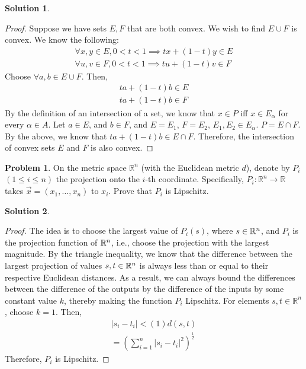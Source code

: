 \documentclass[12pt]{article}
\theoremstyle{definition} %
\newtheorem{solution}{Solution}
\newtheorem{problem}{Problem}
\theoremstyle{plain} %
\begin{document}
\begin{solution}
    \begin{proof}
        Suppose we have sets $E,F$ that are both convex. We wish to find $E\cup F$ is convex. We know the following:
        \begin{align}
            \forall x, y \in E, 0<t<1 \implies tx+(1-t)y\in E\\[10pt] 
            \forall u, v \in F, 0<t<1 \implies tu+(1-t)v \in F
        \end{align}
        Choose $\forall a,b \in E\cup F$. Then,
        \begin{align}
            ta+(1-t)b\in E\\[10pt] 
            ta+(1-t)b \in F
        \end{align} 
        By the definition of an intersection of a set, we know that $x\in P$ iff $x\in E_{\alpha}$ for every $\alpha \in A$. Let $a \in E$, and $b \in F$, and $E = E_1$, $F = E_2$, $E_1, E_2 \in E_{\alpha}$. $P=E\cap F$. By the above, we know that $ta+(1-t)b\in E\cap F$. Therefore, the intersection of convex sets $E$ and $F$ is also convex.        
    \end{proof}
\end{solution}
\begin{problem}
On the metric space $\mathbb{R}^n$ (with the Euclidean metric $d$), denote by $P_i$ $(1 \leq i \leq n)$ the projection onto the $i$-th coordinate. Specifically, $P_i : \mathbb{R}^n \to \mathbb{R}$ takes $\vec{x} = (x_1, \dots, x_n)$ to $x_i$. Prove that $P_i$ is Lipschitz.
\end{problem}
\begin{solution}
    \begin{proof}
        The idea is to choose the largest value of $P_i(s)$, where $s\in \mathbb{\MakeUppercase{r}}^{n}$, and $P_i$ is the projection function of $\mathbb{\MakeUppercase{r}}^{n}$, i.e., choose the projection with the largest magnitude. By the triangle inequality, we know that the difference between the largest projection of values $s, t \in \mathbb{\MakeUppercase{r}}^{n}$ is always less than or equal to their respective Euclidean distances. As a result, we can always bound the differences between the difference of the outputs by the difference of the inputs by some constant value $k$, thereby making the function $P_i$ Lipschitz. For elements $ s, t \in \mathbb{R}^{n} $, choose $k=1$. Then,
        \begin{align}
            \left\vert s_i - t_i \right\vert < (1)d(s,t) \\[10pt] 
            =\left(  \sum_{i=1}^{n} \left\vert s_i - t_i \right\vert^{2}  \right)^{\frac{1}{2}}
        \end{align}
        Therefore, $P_i$ is Lipschitz. 
         \end{proof}
\end{solution}
\end{document}
